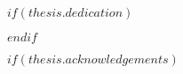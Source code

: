 %   
%     
%     
%     
%    
%   
% 

%


$if(thesis.dedication)$

\dedicatory{\vfill}{}

$endif$

$if(thesis.acknowledgements)$

